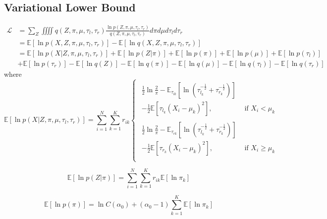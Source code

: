 \documentclass[runningheads]{llncs}
\begin{document}
\subsection{Variational Lower Bound}
\begin{equation} 
   \begin{split}
   \mathcal{L} &=\sum_{Z}\iiiint q(Z,\pi,\mu,\tau_l,\tau_r)\frac{\ln{p(Z,\pi,\mu,\tau_l,\tau_r)}}
   {q(Z,\pi,\mu,\tau_l,\tau_r)} d\pi d\mu d\tau_l d\tau_r
 \\ & = \mathbb{E}[\ln p(X,Z,\pi,\mu,\tau_l,\tau_r)]-\mathbb{E}[\ln q(X,Z,\pi,\mu,\tau_l,\tau_r)]
 \\ & = \mathbb{E}[\ln p(X|Z,\pi,\mu,\tau_l,\tau_r)] + \mathbb{E}[\ln p(Z|\pi)] +\mathbb{E}[\ln p(\pi)]+ \mathbb{E}[\ln p(\mu)]+\mathbb{E}[\ln p(\tau_l)] \\
   & +\mathbb{E}[\ln p(\tau_r)] -\mathbb{E}[\ln q(Z)]-\mathbb{E}[\ln q(\pi)]-\mathbb{E}[\ln q(\mu)]-\mathbb{E}[\ln q(\tau_l)]-\mathbb{E}[\ln q(\tau_r)]
   \end{split}
\end{equation}
where
\begin{equation} 
   \mathbb{E}[\ln p(X|Z,\pi,\mu,\tau_l,\tau_r)] = \sum_{i=1}^{N}\sum_{k=1}^{K}r_{ik}
   \begin{cases}
      \begin{split}
      \frac{1}{2}\ln \frac{2}{\pi}-\mathbb{E}_{\tau_{lk}}[\ln(\tau_{l_k}^{-\frac{1}{2}} +\tau_{r_k}^{-\frac{1}{2}})]
      \\-\frac{1}{2}\mathbb{E}[\tau_{l_k}(X_i-\mu_k)^2],& \text{ if } X_{i}<\mu_{k} \\ &
   \\ \frac{1}{2}\ln \frac{2}{\pi}-\mathbb{E}_{\tau_{rk}}[\ln(\tau_{l_k}^{-\frac{1}{2}} +\tau_{r_k}^{-\frac{1}{2}})] \\
   -\frac{1}{2}\mathbb{E}[\tau_{r_k}(X_i-\mu_k)^2]
   , & \text{ if } X_{i}\geq\mu_{k} \\ &
   \end{split}
\end{cases}
\end{equation}

\begin{equation}
\mathbb{E}[\ln p(Z|\pi)]=\sum_{i=1}^{N}\sum_{k=1}^{K}r_{ik}\mathbb{E}[\ln \pi_k]
\end{equation}

\begin{equation}
   \mathbb{E}[\ln p(\pi)] = \ln C(\alpha_0)+(\alpha_0-1)\sum_{k=1}^{K}\mathbb{E}[\ln \pi_k]
\end{equation}
\end{document}
